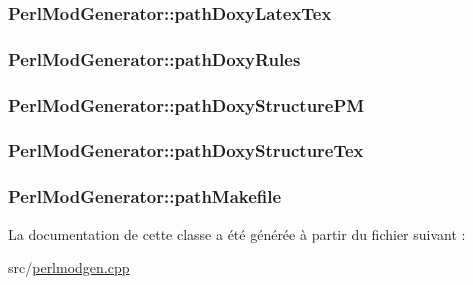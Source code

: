 \subsubsection[{path\+Doxy\+Latex\+Tex}]{ Perl\+Mod\+Generator\+::path\+Doxy\+Latex\+Tex}\label{class_perl_mod_generator_ad2ea9cd9b17663a5b3ff62752031fb2b}
\hypertarget{class_perl_mod_generator_a5b043201cbf4b5840582794d44bdcafb}{}
\subsubsection[{path\+Doxy\+Rules}]{ Perl\+Mod\+Generator\+::path\+Doxy\+Rules}\label{class_perl_mod_generator_a5b043201cbf4b5840582794d44bdcafb}
\hypertarget{class_perl_mod_generator_a4139ab7ca413fcf7e9d9c10a6abb13f2}{}
\subsubsection[{path\+Doxy\+Structure\+P\+M}]{ Perl\+Mod\+Generator\+::path\+Doxy\+Structure\+P\+M}\label{class_perl_mod_generator_a4139ab7ca413fcf7e9d9c10a6abb13f2}
\hypertarget{class_perl_mod_generator_a240a78f6c0326286469e17febcb3e386}{}
\subsubsection[{path\+Doxy\+Structure\+Tex}]{ Perl\+Mod\+Generator\+::path\+Doxy\+Structure\+Tex}\label{class_perl_mod_generator_a240a78f6c0326286469e17febcb3e386}
\hypertarget{class_perl_mod_generator_a2a2147107f3c1812beb023cb68a10c55}{}
\subsubsection[{path\+Makefile}]{ Perl\+Mod\+Generator\+::path\+Makefile}\label{class_perl_mod_generator_a2a2147107f3c1812beb023cb68a10c55}


La documentation de cette classe a été générée à partir du fichier suivant \+:\begin{DoxyCompactItemize}
\item 
src/\hyperlink{perlmodgen_8cpp}{perlmodgen.\+cpp}\end{DoxyCompactItemize}
